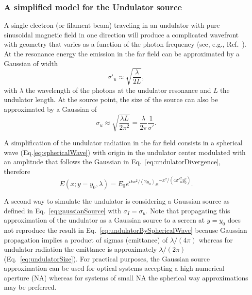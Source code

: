 \documentclass{iucr}              %
\begin{document}
\subsubsection{A simplified model for the Undulator source}
\label{sec:undulator}

A single electron (or filament beam) traveling in an undulator with pure sinusoidal magnetic field in one direction will produce a complicated wavefront with geometry that varies as a function of the photon frequency (see, e.g., Ref.~\cite{elleaume}). At the resonance energy the emission in the far field can be approximated by a Gaussian of width \cite{elleaume}
\begin{equation}
\label{eq:undulatorDivergence}
    \sigma'_u \approx\sqrt{\frac{\lambda}{2 L}},
\end{equation}
with $\lambda$ the wavelength of the photons at the undulator resonance and $L$ the undulator length. At the source point, the size of the source can also be approximated by a Gaussian of
\begin{equation}
\label{eq:undulatorSize}
    \sigma_u \approx\sqrt{\frac{\lambda L}{2 \pi^2}} = \frac{\lambda}{2 \pi} \frac{1}{\sigma'}.
\end{equation}

A  simplification of the undulator radiation in the far field consists in a spherical wave (Eq.\ref{eq:sphericalWave}) with origin in the undulator center modulated with an amplitude that follows the Gaussian in Eq.~\ref{eq:undulatorDivergence}, therefore
\begin{equation}
    \label{eq:undulatorBySphericalWave}
    E(x;y=y_0,\lambda) = E_0 e^{i k x^2 / (2 y_0)} e^{-x^2/(4 \sigma'_u^2 y_0^2)}.
\end{equation}

A second way to simulate the undulator is considering a Gaussian source as defined in Eq.~\ref{eq:gaussianSource} with $\sigma_I=\sigma_u$. Note that propagating this approximation of the undulator as a Gaussian source to a screen at $y=y_0$ does not reproduce the result in Eq.~\ref{eq:undulatorBySphericalWave} because Gaussian propagation implies a product of sigmas (emittance) of $\lambda / (4 \pi)$ whereas for undulator radiation the emittance is approximately $\lambda / (2 \pi)$ (Eq.~\ref{eq:undulatorSize}). For practical purposes, the Gaussian source approximation can be used for optical systems accepting a high numerical aperture (NA) whereas for systems of small NA the spherical way approximations may be preferred.
\end{document}
